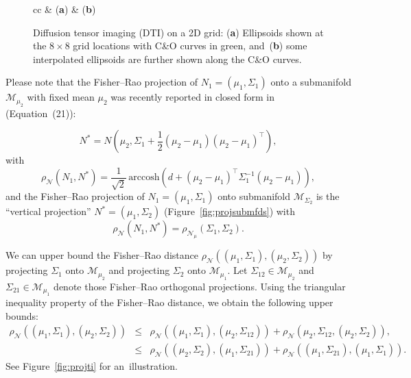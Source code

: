 \documentclass[entropy,article,accept,oneauthor,pdftex,entropy]{Definitions/mdpi}
\def\arccosh{\mathrm{arccosh}}
\def\calM{\mathcal{M}}
\def\calN{\mathcal{N}}
\begin{document}
\begin{figure}[H]

\begin{tabular}{cc}
 &
 \cr
(\textbf{a}) & (\textbf{b})
\end{tabular}
%
\caption{Diffusion tensor imaging (DTI) on a 2D grid: (\textbf{a}) Ellipsoids shown at the $8\times 8$ grid locations with C\&O curves in green, and~(\textbf{b}) some interpolated  ellipsoids are further shown along the C\&O curves.
 \label{fig:gridN}}
\end{figure}




Please note that the Fisher–Rao projection of $N_1=(\mu_1,\Sigma_1)$ onto a submanifold $\calM_{\mu_2}$ with fixed mean $\mu_2$ was recently reported in closed form in~\cite{tang2018information} {(Equation~(21)):} %

$$
N^*=N\left(\mu_2,\Sigma_1+\frac{1}{2}(\mu_2-\mu_1)(\mu_2-\mu_1)^\top\right),
$$
with
$$
\rho_\calN(N_1,N^*)=\frac{1}{\sqrt{2}}\, \arccosh\left(d+(\mu_2-\mu_1)^\top \Sigma_1^{-1} (\mu_2-\mu_1)\right),
$$
 and the Fisher–Rao projection of $N_1=(\mu_1,\Sigma_1)$ onto submanifold  $\calM_{\Sigma_2}$ is the
 ``vertical projection'' $N^*=(\mu_1,\Sigma_2)$ (Figure~\ref{fig:projsubmfds}) with
$$
\rho_\calN(N_1,N^*)=\rho_{\calN_\mu}(\Sigma_1,\Sigma_2).
$$

We can upper bound the Fisher–Rao distance $\rho_\calN((\mu_1,\Sigma_1),(\mu_2,\Sigma_2))$ by projecting $\Sigma_1$ onto $\calM_{\mu_2}$ and projecting $\Sigma_2$ onto $\calM_{\mu_1}$. Let $\Sigma_{12}\in\calM_{\mu_2}$ and $\Sigma_{21}\in\calM_{\mu_1}$ denote those Fisher–Rao orthogonal projections.
Using the triangular inequality property of the Fisher–Rao distance, we obtain the following upper bounds:
\begin{eqnarray}
\rho_\calN((\mu_1,\Sigma_1),(\mu_2,\Sigma_2)) &\leq & \rho_\calN((\mu_1,\Sigma_1),(\mu_2,\Sigma_{12}))
+\rho_\calN(\mu_2,\Sigma_{12},(\mu_2,\Sigma_{2})),\\
&\leq & \rho_\calN((\mu_2,\Sigma_2),(\mu_1,\Sigma_{21}))+\rho_\calN((\mu_1,\Sigma_{21}),(\mu_1,\Sigma_{1})).
\end{eqnarray}
See Figure~\ref{fig:projti} for an~illustration.
\end{document}
